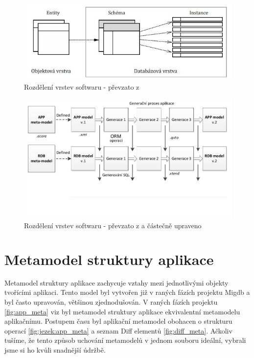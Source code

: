 \documentclass[11pt,twoside,a4paper]{book}
\begin{document}
\begin{figure}[ht]
\begin{center}
\includegraphics[width=15cm]{figures/framework_structura}
\caption{Rozdělení vrstev softwaru - převzato z \cite{Mazanec}}
\label{fig:mazanma:framework}
\end{center}
\end{figure}


\begin{figure}[ht]
\begin{center}
\includegraphics[width=15cm]{figures/framework_structura_tarant_modified}
\caption{Rozdělení vrstev softwaru - převzato z \cite{Tarant_bp} a částečně
upraveno}
\label{fig:framework:modified}
\end{center}
\end{figure}


\section{Metamodel struktury aplikace}

Metamodel struktury aplikace zachycuje vztahy mezi jednotlivými objekty
tvořícími aplikaci. Tento model byl vytvořen již v raných fázích projektu Migdb a
byl často upravován, většinou zjednodušován. V raných fázích projektu
\ref{fig:app_meta} viz \cite{Lukes} byl metamodel struktury aplikace
ekvivalentní metamodelu aplikačnímu. Postupem času byl aplikační metamodel obohacen o
strukturu operací \ref{fig:jezek:app_meta} a seznam Diff elementů
\ref{fig:diff_meta}.
Ačkoliv tušíme, že tento způsob uchování metamodelů v jednom souboru ideální, vybrali jsme si ho kvůli snadnější
údržbě.
\end{document}
